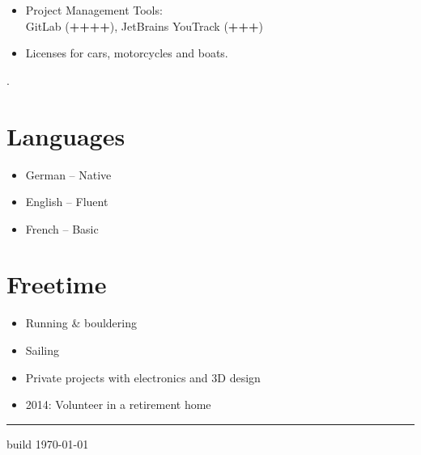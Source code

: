 \documentclass[a4paper,11pt]{article}
\newcommand{\col}[2]{\textcolor[HTML]{#1}{#2}}
\begin{document}
\begin{minipage}[t]{0.65\textwidth}
\begin{minipage}[t]{0.625\textwidth}
\begin{itemize}
            \item Project Management Tools:\\
            GitLab (\textbf{++++}), JetBrains YouTrack (\textbf{+++})

            \item Licenses for cars, motorcycles and boats.
        \end{itemize}
    \end{minipage}
    \hfill
    \begin{minipage}[t]{0.325\textwidth}
        \col{ffffff}{.} %
        \section*{\col{6c84ac}{Languages}}
        \begin{flushleft}
            \begin{itemize}
                \small
                \item German -- Native
                \item English -- Fluent
                \item French -- Basic
            \end{itemize}

            \section*{\col{587aab}{Freetime}}
            \begin{itemize}
                \small
                \item Running \& bouldering
                \item Sailing
                \item Private projects with electronics and 3D design
                \item 2014: Volunteer in a retirement home
            \end{itemize}
        \end{flushleft}
    \end{minipage}

\end{minipage}

\vfill
\hfill
\vspace{0.17cm}
\begin{minipage}[t]{0.65\textwidth}
    \hrule
    \vspace{0.125cm}

    \small build \href{\giturl}{\texttt{\gitcommit}} \hfill \today
\end{minipage}
\end{document}
